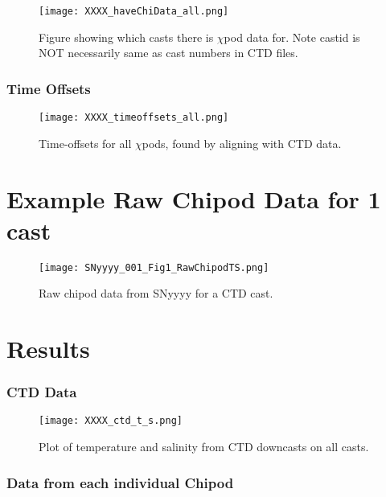 \documentclass[11pt]{article}
\begin{document}
\begin{figure}[htbp]
\texttt{[image: XXXX\_haveChiData\_all.png]}
\caption{Figure showing which casts there is $\chi$pod data for. Note castid is NOT necessarily same as cast numbers in CTD files.}
\label{ischidata}
\end{figure}


\subsubsection{Time Offsets}


\begin{figure}[htbp]
\texttt{[image: XXXX\_timeoffsets\_all.png]}
\caption{Time-offsets for all $\chi$pods, found by aligning with CTD data.}
\label{toffs}
\end{figure}



\newpage
\section{Example Raw Chipod Data for 1 cast}

\begin{figure}[htbp]
\texttt{[image: SNyyyy\_001\_Fig1\_RawChipodTS.png]}
\caption{Raw chipod data from SNyyyy for a CTD cast.}
\label{snyyyy_1}
\end{figure}



\newpage
\section{Results}


\clearpage
\subsubsection{CTD Data }

\begin{figure}[htbp]
\texttt{[image: XXXX\_ctd\_t\_s.png]}
\caption{Plot of temperature and salinity from CTD downcasts on all casts.}
\label{}
\end{figure}


\clearpage
\subsubsection{Data from each individual Chipod}
\end{document}
